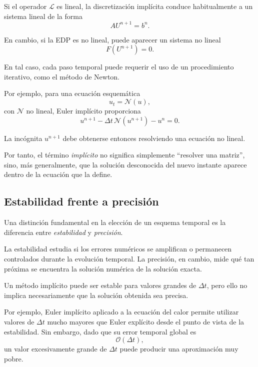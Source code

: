\documentclass[12pt]{article}
\begin{document}
Si el operador $\mathcal{L}$ es lineal, la discretización implícita conduce habitualmente a un sistema lineal de la forma
\begin{equation}
    A U^{n+1}
    =
    b^n.
\end{equation}

En cambio, si la EDP es no lineal, puede aparecer un sistema no lineal
\begin{equation}
    F(U^{n+1})=0.
\end{equation}

En tal caso, cada paso temporal puede requerir el uso de un procedimiento iterativo, como el método de Newton.

Por ejemplo, para una ecuación esquemática
\begin{equation}
    u_t
    =
    \mathcal{N}(u),
\end{equation}
con $\mathcal{N}$ no lineal, Euler implícito proporciona
\begin{equation}
    u^{n+1}
    -
    \Delta t\,\mathcal{N}(u^{n+1})
    -
    u^n
    =
    0.
\end{equation}

La incógnita $u^{n+1}$ debe obtenerse entonces resolviendo una ecuación no lineal.

Por tanto, el término \emph{implícito} no significa simplemente ``resolver una matriz'', sino, más generalmente, que la solución desconocida del nuevo instante aparece dentro de la ecuación que la define.

\subsection*{Estabilidad frente a precisión}

Una distinción fundamental en la elección de un esquema temporal es la diferencia entre \emph{estabilidad} y \emph{precisión}.

La estabilidad estudia si los errores numéricos se amplifican o permanecen controlados durante la evolución temporal. La precisión, en cambio, mide qué tan próxima se encuentra la solución numérica de la solución exacta.

Un método implícito puede ser estable para valores grandes de $\Delta t$, pero ello no implica necesariamente que la solución obtenida sea precisa.

Por ejemplo, Euler implícito aplicado a la ecuación del calor permite utilizar valores de $\Delta t$ mucho mayores que Euler explícito desde el punto de vista de la estabilidad. Sin embargo, dado que su error temporal global es
\begin{equation}
    \mathcal{O}(\Delta t),
\end{equation}
un valor excesivamente grande de $\Delta t$ puede producir una aproximación muy pobre.
\end{document}
